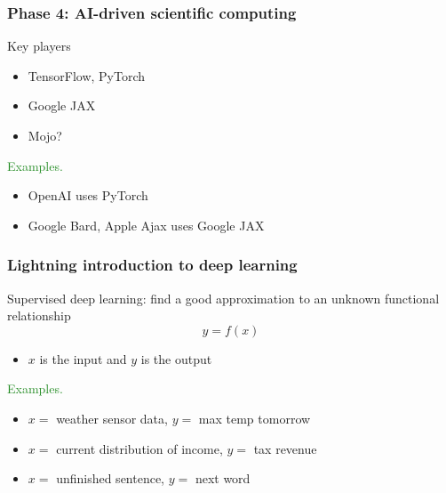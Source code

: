 \documentclass[
    xcolor={svgnames,dvipsnames},
    hyperref={colorlinks, citecolor=DeepPink4, linkcolor=DarkRed, urlcolor=DarkBlue}
    ]{beamer}  %
\newcommand{\Egs}{\textcolor{ForestGreen}{Examples. }}
\newcommand{\1}{\mathbbm 1}
\begin{document}
\begin{frame}
    \frametitle{Phase 4: AI-driven scientific computing}

    Key players
    \begin{itemize}
        \item TensorFlow, PyTorch 
        \vspace{0.5em}
        \item Google JAX
        \vspace{0.5em}
        \item Mojo?
    \end{itemize}

    \Egs

    \begin{itemize}
        \item OpenAI uses PyTorch
        \vspace{0.5em}
        \item Google Bard, Apple Ajax uses Google JAX
        \vspace{0.5em}
    \end{itemize}
    
\end{frame}


\begin{frame}
    \frametitle{Lightning introduction to deep learning}
    
    Supervised deep learning: find a good approximation to an unknown functional
    relationship
    \begin{equation*}
        y = f(x)
    \end{equation*}

    \begin{itemize}
        \item $x$ is the input and $y$ is the output
    \end{itemize}

    \Egs
    \begin{itemize}
        \item $x = $ weather sensor data, $y = $ max temp tomorrow
        \item $x = $ current distribution of income, $y = $ tax revenue
        \item $x = $ unfinished sentence, $y = $ next word
    \end{itemize}

\end{frame}
\end{document}
